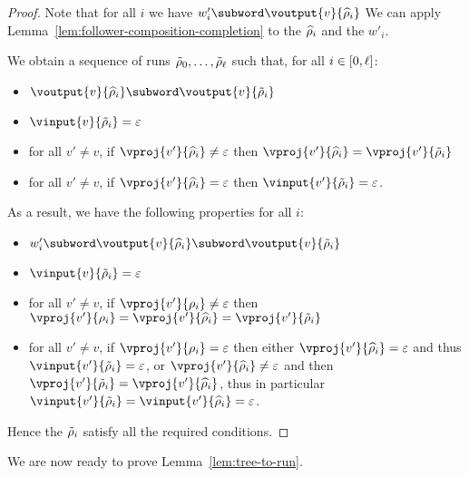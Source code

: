 \begin{proof}
Note that for all $i$ we have $w'_i \subword \voutput{v}{\widehat{\run}_i}$
We can apply Lemma~\ref{lem:follower-composition-completion} to the $\widehat{\rho}_i$ and the $w'_i$.

We obtain a sequence of runs $\Tilde{\rho}_0, \ldots, \Tilde{\rho}_\ell$ such that, for all $i\in[0,\ell]$:
\begin{itemize}
	\item $\voutput{v}{\widehat{\run}_i} \subword \voutput{v}{\Tilde{\run}_i}$
	
	\item $\vinput{v}{\Tilde{\run}_i} = \epsilon$
	
	\item for all $v' \neq v$, if $\vproj{v'}{\widehat{\run}_i} \neq \epsilon$ then $\vproj{v'}{\widehat{\run}_i} = \vproj{v'}{\Tilde{\run}_i}$
	
	\item for all $v' \neq v$, if $\vproj{v'}{\widehat{\run}_i} = \epsilon$ then  $\vinput{v'}{\Tilde{\run}_i} = \epsilon$.
\end{itemize}

As a result, we have the following properties for all $i$:
\begin{itemize}
	\item $w'_i \subword \voutput{v}{\widehat{\run}_i} \subword \voutput{v}{\Tilde{\run}_i}$
	
	\item $\vinput{v}{\Tilde{\run}_i} = \epsilon$
	
	\item for all $v' \neq v$, if $\vproj{v'}{\run_i} \neq \epsilon$ then $\vproj{v'}{\run_i} = \vproj{v'}{\widehat{\run}_i} = \vproj{v'}{\Tilde{\run}_i}$
	
	\item for all $v' \neq v$, if $\vproj{v'}{\run_i} = \epsilon$ then either $\vproj{v'}{\widehat{\run}_i} = \epsilon$ and thus $\vinput{v'}{\Tilde{\run}_i} = \epsilon$, or $\vproj{v'}{\widehat{\run}_i} \neq \epsilon$ and then $\vproj{v'}{\Tilde{\run}_i} = \vproj{v'}{\widehat{\run}_i}$, thus in particular $\vinput{v'}{\Tilde{\run}_i} = \vinput{v'}{\widehat{\run}_i} = \epsilon$. 
\end{itemize}

Hence the $\Tilde{\rho}_i$ satisfy all the required conditions.
\end{proof}

We are now ready to prove Lemma~\ref{lem:tree-to-run}.

\LemTreeToRun*

